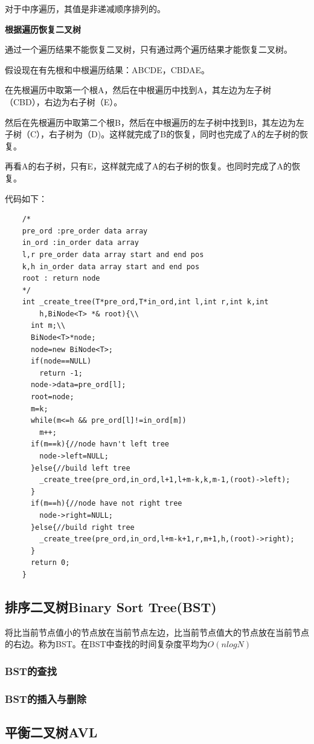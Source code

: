 \documentclass{article}
\begin{document}
		对于中序遍历，其值是非递减顺序排列的。

		\textbf{根据遍历恢复二叉树}

		通过一个遍历结果不能恢复二叉树，只有通过两个遍历结果才能恢复二叉树。

		假设现在有先根和中根遍历结果：ABCDE，CBDAE。

		在先根遍历中取第一个根A，然后在中根遍历中找到A，其左边为左子树（CBD），右边为右子树（E）。

		然后在先根遍历中取第二个根B，然后在中根遍历的左子树中找到B，其左边为左子树（C），右子树为（D)。这样就完成了B的恢复，同时也完成了A的左子树的恢复。

		再看A的右子树，只有E，这样就完成了A的右子树的恢复。也同时完成了A的恢复。
		
		代码如下：
		\begin{verbatim}
    /*
    pre_ord :pre_order data array
    in_ord :in_order data array
    l,r pre_order data array start and end pos
    k,h in_order data array start and end pos
    root : return node
    */
    int _create_tree(T*pre_ord,T*in_ord,int l,int r,int k,int
        h,BiNode<T> *& root){\\
      int m;\\
      BiNode<T>*node;
      node=new BiNode<T>;
      if(node==NULL)
        return -1;
      node->data=pre_ord[l];
      root=node;
      m=k;
      while(m<=h && pre_ord[l]!=in_ord[m])
        m++;
      if(m==k){//node havn't left tree
        node->left=NULL;
      }else{//build left tree
        _create_tree(pre_ord,in_ord,l+1,l+m-k,k,m-1,(root)->left);
      }
      if(m==h){//node have not right tree
        node->right=NULL;
      }else{//build right tree
        _create_tree(pre_ord,in_ord,l+m-k+1,r,m+1,h,(root)->right);
      }
      return 0;
    }
		\end{verbatim}
	\subsection{排序二叉树Binary Sort Tree(BST)}
		将比当前节点值小的节点放在当前节点左边，比当前节点值大的节点放在当前节点的右边。称为BST。在BST中查找的时间复杂度平均为$O(nlogN)$
		\subsubsection{BST的查找}
		\subsubsection{BST的插入与删除}
	\subsection{平衡二叉树AVL}
\end{document}
